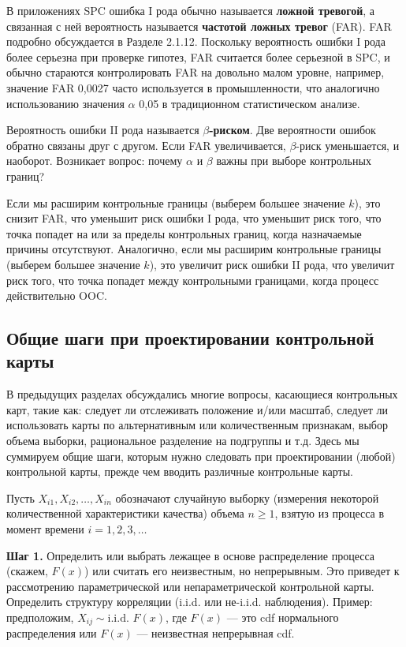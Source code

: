 В приложениях SPC ошибка I рода обычно называется \textbf{ложной тревогой}, а связанная с ней вероятность называется \textbf{частотой ложных тревог} (FAR). FAR подробно обсуждается в Разделе 2.1.12. Поскольку вероятность ошибки I рода более серьезна при проверке гипотез, FAR считается более серьезной в SPC, и обычно стараются контролировать FAR на довольно малом уровне, например, значение FAR 0,0027 часто используется в промышленности, что аналогично использованию значения \(\alpha\) 0,05 в традиционном статистическом анализе.

Вероятность ошибки II рода называется \textbf{\(\beta\)-риском}. Две вероятности ошибок обратно связаны друг с другом. Если FAR увеличивается, \(\beta\)-риск уменьшается, и наоборот. Возникает вопрос: почему \(\alpha\) и \(\beta\) важны при выборе контрольных границ?

Если мы расширим контрольные границы (выберем большее значение \(k\)), это снизит FAR, что уменьшит риск ошибки I рода, что уменьшит риск того, что точка попадет на или за пределы контрольных границ, когда назначаемые причины отсутствуют. Аналогично, если мы расширим контрольные границы (выберем большее значение \(k\)), это увеличит риск ошибки II рода, что увеличит риск того, что точка попадет между контрольными границами, когда процесс действительно OOC.

\subsection{Общие шаги при проектировании контрольной карты}
В предыдущих разделах обсуждались многие вопросы, касающиеся контрольных карт, такие как: следует ли отслеживать положение и/или масштаб, следует ли использовать карты по альтернативным или количественным признакам, выбор объема выборки, рациональное разделение на подгруппы и т.д. Здесь мы суммируем общие шаги, которым нужно следовать при проектировании (любой) контрольной карты, прежде чем вводить различные контрольные карты.

Пусть \(X_{i1}, X_{i2}, \ldots, X_{in}\) обозначают случайную выборку (измерения некоторой количественной характеристики качества) объема \(n \geq 1\), взятую из процесса в момент времени \(i = 1, 2, 3, \ldots\)

\textbf{Шаг 1.} Определить или выбрать лежащее в основе распределение процесса (скажем, \(F(x)\)) или считать его неизвестным, но непрерывным. Это приведет к рассмотрению параметрической или непараметрической контрольной карты. Определить структуру корреляции (i.i.d. или не-i.i.d. наблюдения). Пример: предположим, \(X_{ij} \sim \text{i.i.d. } F(x)\), где \(F(x)\) — это cdf нормального распределения или \(F(x)\) — неизвестная непрерывная cdf.

